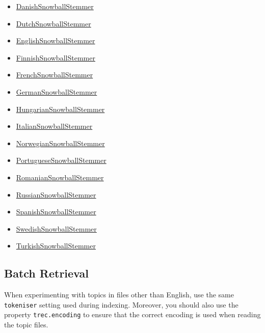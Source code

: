 \begin{itemize}
\tightlist
\item
  \href{javadoc/org/terrier/terms/DanishSnowballStemmer.html}{DanishSnowballStemmer}
\item
  \href{javadoc/org/terrier/terms/DutchSnowballStemmer.html}{DutchSnowballStemmer}
\item
  \href{javadoc/org/terrier/terms/EnglishSnowballStemmer.html}{EnglishSnowballStemmer}
\item
  \href{javadoc/org/terrier/terms/FinnishSnowballStemmer.html}{FinnishSnowballStemmer}
\item
  \href{javadoc/org/terrier/terms/FrenchSnowballStemmer.html}{FrenchSnowballStemmer}
\item
  \href{javadoc/org/terrier/terms/GermanSnowballStemmer.html}{GermanSnowballStemmer}
\item
  \href{javadoc/org/terrier/terms/HungarianSnowballStemmer.html}{HungarianSnowballStemmer}
\item
  \href{javadoc/org/terrier/terms/ItalianSnowballStemmer.html}{ItalianSnowballStemmer}
\item
  \href{javadoc/org/terrier/terms/NorwegianSnowballStemmer.html}{NorwegianSnowballStemmer}
\item
  \href{javadoc/org/terrier/terms/PortugueseSnowballStemmer.html}{PortugueseSnowballStemmer}
\item
  \href{javadoc/org/terrier/terms/RomanianSnowballStemmer.html}{RomanianSnowballStemmer}
\item
  \href{javadoc/org/terrier/terms/RussianSnowballStemmer.html}{RussianSnowballStemmer}
\item
  \href{javadoc/org/terrier/terms/SpanishSnowballStemmer.html}{SpanishSnowballStemmer}
\item
  \href{javadoc/org/terrier/terms/SwedishSnowballStemmer.html}{SwedishSnowballStemmer}
\item
  \href{javadoc/org/terrier/terms/TurkishSnowballStemmer.html}{TurkishSnowballStemmer}
\end{itemize}

\subsection{Batch Retrieval}\label{batch-retrieval}

When experimenting with topics in files other than English, use the same
\texttt{tokeniser} setting used during indexing. Moreover, you should
also use the property \texttt{trec.encoding} to ensure that the correct
encoding is used when reading the topic files.


